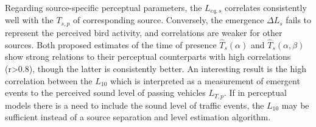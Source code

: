 \documentclass[11pt,a4paper]{article}
\begin{document}
Regarding source-specific perceptual parameters, the $L_{eq, s}$ correlates consistently well with the $T_{s, p}$ of corresponding source. Conversely, the emergence $\Delta L_s$ fails to represent the perceived bird activity, and correlations are weaker for other sources. Both proposed estimates of the time of presence $\hat T_s(\alpha)$ and $\hat T_s(\alpha, \beta)$ show strong relations to their perceptual counterparts with high correlations (r>0.8), though the latter is consistently better. An interesting result is the high correlation between the $L_{10}$ which is interpreted as a measurement of emergent events to the perceived sound level of passing vehicles $L_{T, p}$. If in perceptual models there is a need to include the sound level of traffic events, the $L_{10}$ may be sufficient instead of a source separation and level estimation algorithm.\\
\end{document}
